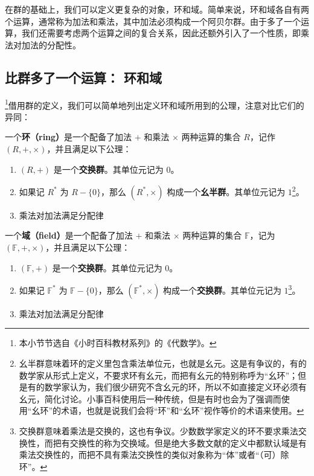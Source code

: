 
\begin{issues}
\issueDraft
{}
\end{issues}



在群的基础上，我们可以定义更复杂的对象，环和域。简单来说，环和域各自有两个运算，通常称为加法和乘法，其中加法必须构成一个阿贝尔群。由于多了一个运算，我们还需要考虑两个运算之间的复合关系，因此还额外引入了一个性质，即乘法对加法的分配性。

\subsection{比群多了一个运算： 环和域}

\footnote{本小节节选自《小时百科教材系列》的《代数学》。}借用群的定义，我们可以简单地列出定义环和域所用到的公理，注意对比它们的异同：

\begin{definition}{}
一个\textbf{环（ring）}是一个配备了加法 $+$ 和乘法 $\times$ 两种运算的集合 $R$，记作 $(R, +, \times)$，并且满足以下公理：
\begin{enumerate}
    \item $(R, +)$ 是一个\textbf{交换群}。其单位元记为 $0$。
    \item 如果记 $R^*$ 为 $R-\{0\}$，那么 $(R^*, \times)$ 构成一个\textbf{幺半群}。其单位元记为 $1$\footnote{幺半群意味着环的定义里包含乘法单位元，也就是幺元。这是有争议的，有的数学家从形式上定义，不要求环有幺元，而把有幺元的特别称呼为“幺环”；但是有的数学家认为，我们很少研究不含幺元的环，所以不如直接定义环必须有幺元，简化讨论。小事百科使用后一种传统，但是有时也会为了强调而使用“幺环”的术语，也就是说我们会将“环”和“幺环”视作等价的术语来使用。}。
    \item 乘法对加法满足分配律
\end{enumerate}
\end{definition}

\begin{definition}{}
一个\textbf{域（field）}是一个配备了加法 $+$ 和乘法 $\times$ 两种运算的集合 $\mathbb{F}$，记为 $(\mathbb{F}, +, \times)$，并且满足以下公理：

\begin{enumerate}
    \item $(\mathbb{F}, +)$ 是一个\textbf{交换群}。其单位元记为 $0$。
    \item 如果记 $\mathbb{F}^*$ 为 $\mathbb{F}-\{0\}$，那么 $(\mathbb{F}^*, \times)$ 构成一个\textbf{交换群}。其单位元记为 $1$\footnote{交换群意味着乘法是交换的，这也有争议。少数数学家定义的环不要求乘法交换性，而把有交换性的称为交换域。但是绝大多数文献的定义中都默认域是有乘法交换性的，而把不具有乘法交换性的类似对象称为“体”或者“（可）除环”。}。
    \item 乘法对加法满足分配律
\end{enumerate}
\end{definition}


